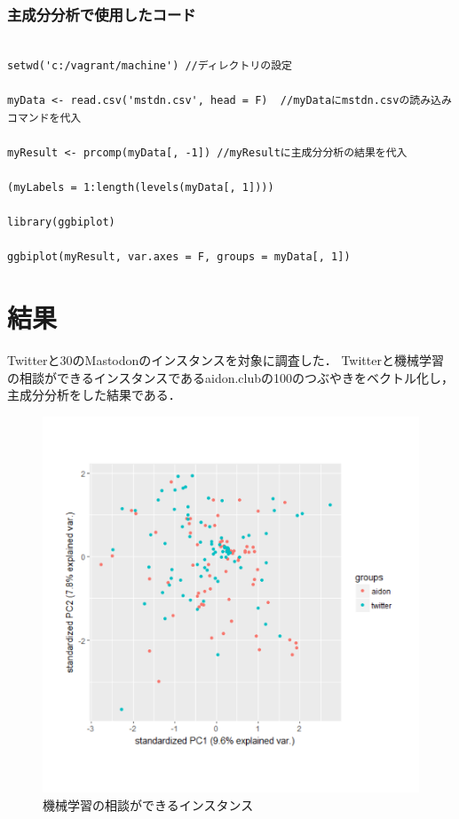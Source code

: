 \subsection{主成分分析で使用したコード}
\begin{verbatim}

setwd('c:/vagrant/machine') //ディレクトリの設定

myData <- read.csv('mstdn.csv', head = F)  //myDataにmstdn.csvの読み込みコマンドを代入

myResult <- prcomp(myData[, -1]) //myResultに主成分分析の結果を代入

(myLabels = 1:length(levels(myData[, 1]))) 
 
library(ggbiplot)

ggbiplot(myResult, var.axes = F, groups = myData[, 1])

\end{verbatim}

\newpage


\chapter{結果}
Twitterと30のMastodonのインスタンスを対象に調査した．
Twitterと機械学習の相談ができるインスタンスであるaidon.clubの100のつぶやきをベクトル化し，主成分分析をした結果である．
\begin{figure}[h]
\centering
\includegraphics[width=13cm,clip]{aidon.pdf}
\caption{機械学習の相談ができるインスタンス}\label{aidon}
\end{figure}
\newpage

